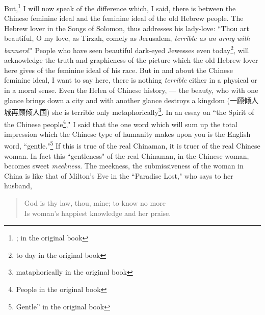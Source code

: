 But,\footnote{; in the original book} I will now speak of the difference which, I said, there is between the Chinese feminine ideal and the feminine ideal of the old Hebrew people.
The Hebrew lover in the Songs of Solomon, thus addresses his lady-love: ``Thou art beautiful, O my love, as Tirzah, comely as Jerusalem,  \emph{terrible as an army with banners}!"
People who have seen beautiful dark-eyed Jewesses even today\footnote{to day in the original book}, will acknowledge the truth and graphicness of the picture which the old Hebrew lover here gives of the feminine ideal of his race.
But in and about the Chinese feminine ideal, I want to say here, there is nothing \emph{terrible} either in a physical or in a moral sense.
Even the Helen of Chinese history, --- the beauty, who with one glance brings down a city and with another glance destroys a kingdom (一顾倾人城再顾倾人国) she is terrible only metaphorically\footnote{mataphorically in the original book}.
In an essay on ``the Spirit of the Chinese people\footnote{People in the original book},"
I said that the one word which will sum up the total impression which the Chinese type of humanity makes upon you is the English word, ``gentle."\footnote{Gentle'' in the original book}
If this is true of the real Chinaman, it is truer of the real Chinese woman.
In fact this ``gentleness" of the real Chinaman, in the Chinese woman, becomes sweet \emph{meekness}.
The meekness, the submissiveness of the woman in China is like that of Milton's  Eve in the ``Paradise Lost,"  who says to her husband,
\begin{quote}\footnotesize
   God is thy law, thou, mine; to know no more\\
   Is woman's happiest knowledge and her praise.\\
\end{quote}

